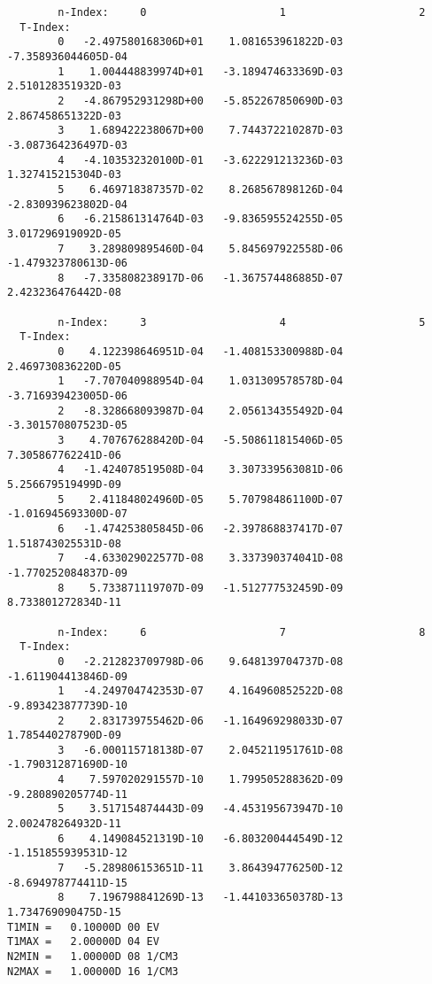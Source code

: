 \documentclass[amsmath,amssymb,a4]{revtex4}
\begin{document}
\begin{small}\begin{verbatim}
        n-Index:     0                     1                     2
  T-Index:
        0   -2.497580168306D+01    1.081653961822D-03   -7.358936044605D-04
        1    1.004448839974D+01   -3.189474633369D-03    2.510128351932D-03
        2   -4.867952931298D+00   -5.852267850690D-03    2.867458651322D-03
        3    1.689422238067D+00    7.744372210287D-03   -3.087364236497D-03
        4   -4.103532320100D-01   -3.622291213236D-03    1.327415215304D-03
        5    6.469718387357D-02    8.268567898126D-04   -2.830939623802D-04
        6   -6.215861314764D-03   -9.836595524255D-05    3.017296919092D-05
        7    3.289809895460D-04    5.845697922558D-06   -1.479323780613D-06
        8   -7.335808238917D-06   -1.367574486885D-07    2.423236476442D-08

        n-Index:     3                     4                     5
  T-Index:
        0    4.122398646951D-04   -1.408153300988D-04    2.469730836220D-05
        1   -7.707040988954D-04    1.031309578578D-04   -3.716939423005D-06
        2   -8.328668093987D-04    2.056134355492D-04   -3.301570807523D-05
        3    4.707676288420D-04   -5.508611815406D-05    7.305867762241D-06
        4   -1.424078519508D-04    3.307339563081D-06    5.256679519499D-09
        5    2.411848024960D-05    5.707984861100D-07   -1.016945693300D-07
        6   -1.474253805845D-06   -2.397868837417D-07    1.518743025531D-08
        7   -4.633029022577D-08    3.337390374041D-08   -1.770252084837D-09
        8    5.733871119707D-09   -1.512777532459D-09    8.733801272834D-11

        n-Index:     6                     7                     8
  T-Index:
        0   -2.212823709798D-06    9.648139704737D-08   -1.611904413846D-09
        1   -4.249704742353D-07    4.164960852522D-08   -9.893423877739D-10
        2    2.831739755462D-06   -1.164969298033D-07    1.785440278790D-09
        3   -6.000115718138D-07    2.045211951761D-08   -1.790312871690D-10
        4    7.597020291557D-10    1.799505288362D-09   -9.280890205774D-11
        5    3.517154874443D-09   -4.453195673947D-10    2.002478264932D-11
        6    4.149084521319D-10   -6.803200444549D-12   -1.151855939531D-12
        7   -5.289806153651D-11    3.864394776250D-12   -8.694978774411D-15
        8    7.196798841269D-13   -1.441033650378D-13    1.734769090475D-15
T1MIN =   0.10000D 00 EV
T1MAX =   2.00000D 04 EV
N2MIN =   1.00000D 08 1/CM3
N2MAX =   1.00000D 16 1/CM3
\end{verbatim}\end{small}
\end{document}

